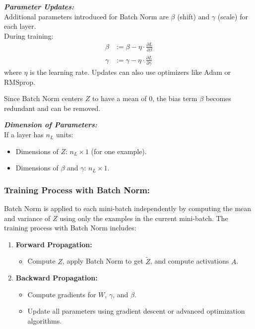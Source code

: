 \documentclass[letterpaper,12pt,notitlepage,twoside]{report}
\begin{document}
\textit{\textbf{Parameter Updates:}} \\
Additional parameters introduced for Batch Norm are \( \beta \) (shift) and \( \gamma \) (scale) for each layer. \\
During training:
\begin{align*}
    \beta &:= \beta - \eta \cdot \frac{\partial L}{\partial \beta} \\
    \gamma &:= \gamma - \eta \cdot \frac{\partial L}{\partial \gamma}
\end{align*}
where \( \eta \) is the learning rate. Updates can also use optimizers like Adam or RMSprop.

Since Batch Norm centers \( Z \) to have a mean of 0, the bias term \( \beta \) becomes redundant and can be removed.

\textit{\textbf{Dimension of Parameters:}} \\
If a layer has \( n_L \) units:
\begin{itemize}[noitemsep, topsep=0pt]
    \item Dimensions of \( Z \): \( n_L \times 1 \) (for one example).
    \item Dimensions of \( \beta \) and \( \gamma \): \( n_L \times 1 \).
\end{itemize}

\subsubsection{Training Process with Batch Norm:}
Batch Norm is applied to each mini-batch independently by computing the mean and variance of \( Z \) using only the examples in the current mini-batch. The training process with Batch Norm includes:
\begin{enumerate}[noitemsep, topsep=0pt]
    \item \textbf{Forward Propagation:}
    \begin{itemize}
        \item Compute \( Z \), apply Batch Norm to get \( \tilde{Z} \), and compute activations \( A \).
    \end{itemize}
    \item \textbf{Backward Propagation:}
    \begin{itemize}
        \item Compute gradients for \( W \), \( \gamma \), and \( \beta \).
        \item Update all parameters using gradient descent or advanced optimization algorithms.
    \end{itemize}
\end{enumerate}
\end{document}
